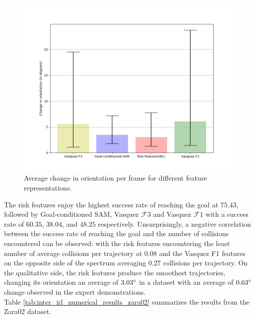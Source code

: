 \begin{figure}[htbp]
\begin{subfigure}[t]{.5\columnwidth}
		\label{fig:inter_method-count_collisions-zara02}
	\end{subfigure}%
	\label{fig:inter_method-classic_navigation_metrics-zara02}
\end{figure}

\begin{figure}[htbp]
	\includegraphics[width=.95\linewidth]{plots/zara02_inter_irl_adjusted_speed/compute_trajectory_smoothness_zara02_adjusted_inter_irl.png}
	\caption{Average change in orientation per frame for different feature representations.}
	\label{fig:inter_irl-trajectory_smoothness-zara02}
\end{figure}

 The risk features enjoy the highest success rate of reaching the goal at $75.43$, followed by Goal-conditioned SAM, Vasquez $\mathcal{F}3$ and Vasquez $\mathcal{F}1$ with a success rate of $60.35$, $38.04$, and $48.25$ respectively. Unsurprisingly, a negative correlation between the success rate of reaching the goal and the number of collisions encountered can be observed: with the risk features encountering the least number of average collisions per trajectory at $0.08$ and the Vasquez F1 features on the opposite side of the spectrum averaging $0.27$ collisions per trajectory.  
On the qualitative side, the risk features produce the smoothest trajectories, changing its orientation an average of $3.03\degree$ in a dataset with an average of $0.63\degree$ change observed in the expert demonstrations. \\
Table \autoref{tab:inter_irl_numerical_results_zara02} summarizes the results from the Zara02 dataset.


